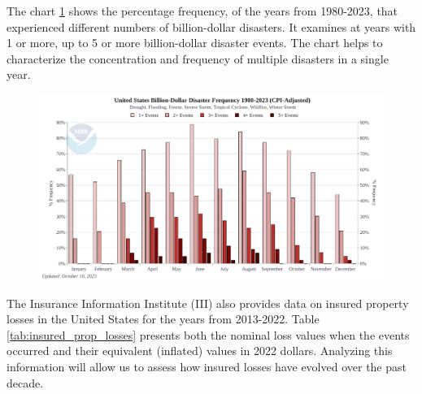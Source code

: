 \documentclass[12pt]{article}
\begin{document}
\begin{table}[h]
    \caption{Natural Catastrophe Losses in the United States by Peril, 2022 (in \$ millions)}
    \label{tab:natural_cat_losses}
    \centering
    \cite{iii}
\end{table}

The chart \ref{fig:disaster_freq} shows the percentage frequency, of the years from 1980-2023, that experienced different numbers of 
billion-dollar disasters. It examines at years with 1 or more, up to 5 or more billion-dollar disaster events. The chart helps to 
characterize the concentration and frequency of multiple disasters in a single year.

\begin{figure}[ht]
    \centering
    \includegraphics[width=0.8\linewidth]{NCEI US disaster freq.pdf}
    \label{fig:disaster_freq}
    \cite{ncei}
\end{figure}

The Insurance Information Institute (III) \cite{iii} also provides data on insured property losses in the United States for the years 
from 2013-2022. Table \ref{tab:insured_prop_losses} presents both the nominal loss values when the events occurred and their equivalent 
(inflated) values in 2022 dollars. Analyzing this information will allow us to assess how insured losses have evolved over the past decade.
\end{document}
